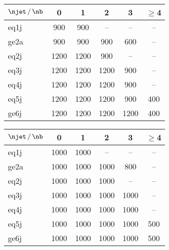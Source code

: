 
\begin{table}[!h]
  \label{tab:sr-binning}
  \centering
  \begin{tabular}{ lccccc }
    \hline
    $\njet\, / \,\nb$ & 0    & 1    & 2    & 3    & $\geq$4 \\
    \hline
    eq1j              & 900  & 900  & --   & --   & --      \\ 
    ge2a              & 900  & 900  & 900  & 600  & --      \\ 
    eq2j              & 1200 & 1200 & 900  & --   & --      \\ 
    eq3j              & 1200 & 1200 & 1200 & 900  & --      \\ 
    eq4j              & 1200 & 1200 & 1200 & 900  & --      \\ 
    eq5j              & 1200 & 1200 & 1200 & 900  & 400     \\ 
    ge6j              & 1200 & 1200 & 1200 & 1200 & 400     \\ 
    \hline
  \end{tabular}
\end{table}

\begin{table}[!h]
  \label{tab:}
  \centering
  \begin{tabular}{ lccccc }
    \hline
    $\njet\, / \,\nb$ & 0    & 1    & 2    & 3    & $\geq$4 \\
    \hline
    eq1j              & 1000 & 1000 & --   & --   & --      \\ 
    ge2a              & 1000 & 1000 & 1000 & 800  & --      \\ 
    eq2j              & 1000 & 1000 & 1000 & --   & --      \\ 
    eq3j              & 1000 & 1000 & 1000 & 1000 & --      \\ 
    eq4j              & 1000 & 1000 & 1000 & 1000 & --      \\ 
    eq5j              & 1000 & 1000 & 1000 & 1000 & 500     \\ 
    ge6j              & 1000 & 1000 & 1000 & 1000 & 500     \\ 
  \hline
  \end{tabular}
\end{table}

